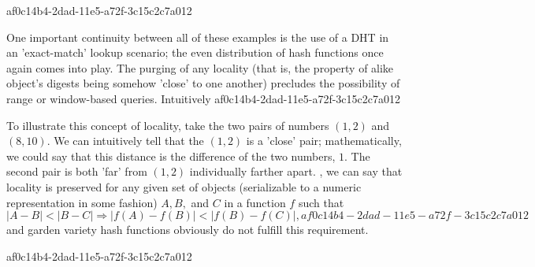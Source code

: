 \documentclass[12pt]{article}
\begin{document}
af0c14b4-2dad-11e5-a72f-3c15c2c7a012\par One important continuity between all of these examples is the use of a DHT in an 'exact-match' lookup scenario; the even distribution of hash functions once again comes into play. The purging of any locality (that is, the property of alike object's digests being somehow 'close' to one another) precludes the possibility of range or window-based queries. Intuitively
af0c14b4-2dad-11e5-a72f-3c15c2c7a012
\par To illustrate this concept of locality, take the two pairs of numbers $(1,2)$ and $(8,10)$. We can intuitively tell that the $(1,2)$ is a 'close' pair; mathematically, we could say that this distance is the difference of the two numbers, $1$. The second pair is both 'far' from $(1,2)$ individually farther apart. , we can say that locality is preserved for any given set of objects (serializable to a numeric representation in some fashion) $A,B,$ and $C$ in a function $f$ such that
\begin{equation}
|A-B| < |B-C| \Rightarrow |f(A)-f(B)| < |f(B) - f(C)|,
af0c14b4-2dad-11e5-a72f-3c15c2c7a012\end{equation}
and garden variety hash functions obviously do not fulfill this requirement.

\printbibliography
af0c14b4-2dad-11e5-a72f-3c15c2c7a012
\end{document}
